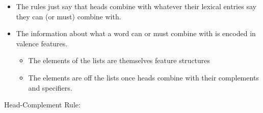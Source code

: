 \documentclass[a4paper,landscape,headrule,footrule]{foils}
\begin{document}
\begin{small}


\end{small}


\begin{itemize}
\item The rules just say that heads combine with whatever
their lexical entries say they can (or must) combine
with.
\item The information about what a word can or must
combine with is encoded in  valence
features.
\begin{itemize}
\item The elements of the lists are themselves feature structures
\item The elements are  off the lists once heads
combine with their complements and specifiers.
\end{itemize}
\end{itemize}

Head-Complement Rule:
\end{document}
